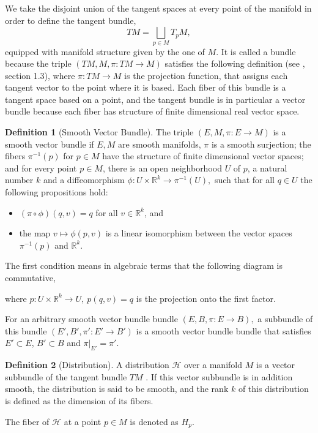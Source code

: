 \documentclass[12pt, letterpaper, reqno]{amsart}
\theoremstyle{definition}
\newtheorem{df}{Definition}
\theoremstyle{plain}
\theoremstyle{remark}
\begin{document}
We take the disjoint union of the tangent spaces at every point of the manifold in order to define the tangent bundle,
$$ TM = \bigsqcup_{p\in M} T_pM, $$ 
equipped with manifold structure given by the one of $ M. $ It is called a bundle because the triple $ (TM, M,\pi:TM \rightarrow {M}) $ satisfies the following definition (see \cite{luke2013vector}, section 1.3), where $ \pi:TM \rightarrow {M} $  is the projection function, that assigns each tangent vector to the point where it is based. Each fiber of this bundle is a tangent space based on a point, and the tangent bundle is in particular a vector bundle because each fiber has structure of finite dimensional real vector space.
\begin{df}[Smooth Vector Bundle]\label{def:smooth_vector_bundle}
	The triple $ (E, M, \pi: E \rightarrow {M}) $ is a smooth vector bundle if $ E,M $ are smooth manifolds, $ \pi $ is a smooth surjection; the fibers $ \pi^{-1}(p) $ for $ p\in M $  have the structure of finite dimensional vector spaces; and for every point $ p\in M $, there is an open neighborhood $ U $ of $ p $, a natural number $ k $ and a diffeomorphism $ \phi: U\times \mathbb{R}^k \rightarrow  \pi^{-1}(U),$ such that for all $ q\in U $ the following propositions hold:  

	\begin{itemize}
		\item $ (\pi\circ \phi)(q,v)=q $ for all $ v\in \mathbb{R}^k $, and  
		\item the map $ v \mapsto \phi(p,v) $ is a linear isomorphism between the vector spaces $\pi^{-1}(p) $ and $ \mathbb{R}^k. $     
	\end{itemize}
	The first condition means in algebraic terms that the following diagram is commutative,	
	\begin{center}
	\end{center}
	where $ p:U\times \mathbb{R}^k \rightarrow U, \ p(q,v)=q$ is the projection onto the first factor.
\end{df}


For an arbitrary smooth vector bundle bundle $ (E,B,\pi:E \rightarrow {B}), $ a subbundle of this bundle $ (E',B',\pi':E' \rightarrow {B'}) $  is a smooth vector bundle bundle that satisfies $ E'\subset E $, $ B'\subset B $ and $ \pi|_{E'}=\pi'. $
\begin{df}[Distribution]
	
	A distribution $ \mathcal{H} $ over a manifold $ M $  is a vector subbundle of the tangent bundle $ TM $ . If this vector subbundle is in addition smooth, the distribution is said to be smooth, and the rank $ k $  of this distribution is defined as the dimension of its fibers.

	The fiber of $ \mathcal{H} $ at a point $ p\in M $ is denoted as $ H_p. $ 
\end{df}
\end{document}
